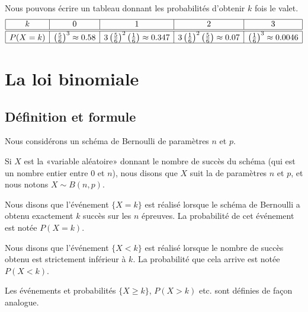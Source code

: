 \begin{example}
    Nous pouvons écrire un tableau donnant les probabilités d'obtenir \( k\) fois le valet.
    \begin{equation}
        \begin{array}[]{|c|c|c|c|c|}
            \hline
            k&0&1&2&3\\
            \hline\hline
            P(X=k)&\left( \frac{ 5 }{ 6 } \right)^3\approx 0.58& 3\left( \frac{ 5 }{ 6 } \right)^2\left( \frac{1}{ 6 } \right)\approx 0.347 &3\left( \frac{1}{ 6 } \right)^2\left( \frac{ 5 }{ 6 } \right)\approx 0.07&\left( \frac{1}{ 6 } \right)^3\approx0.0046\\
            \hline
        \end{array}
    \end{equation}

\end{example}

\section{La loi binomiale}

\subsection{Définition et formule}

Nous considérons un schéma de Bernoulli de paramètres \( n\) et \( p\).
\begin{Aretenir}
    Si \( X\) est la «variable aléatoire» donnant le nombre de succès du schéma (qui est un nombre entier entre \( 0\) et \( n\)), nous disons que \( X\) suit la  de paramètres \( n\) et \( p\), et nous notons \( X\sim B(n,p)\).

    Nous disons que l'événement \( \{ X=k \}\) est réalisé lorsque le schéma de Bernoulli a obtenu exactement \( k\) succès sur les \( n\) épreuves. La probabilité de cet événement est notée \( P(X=k)\).

    Nous disons que l'événement \( \{ X<k \}\) est réalisé lorsque le nombre de succès obtenu est strictement inférieur à \( k\). La probabilité que cela arrive est notée \( P(X<k)\).

    Les événements et probabilités \( \{ X\geq k \}\), \( P(X>k)\) etc. sont définies de façon analogue.
\end{Aretenir}

